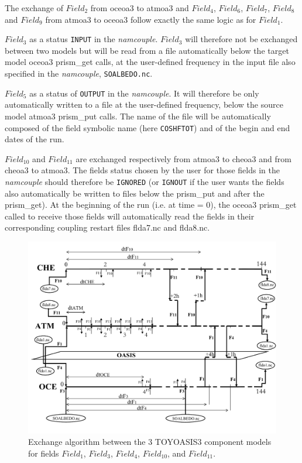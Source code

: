 The exchange of $Field_2$ from oceoa3 to atmoa3 and $Field_4$, $Field_6$,
$Field_7$, $Field_8$ and $Field_9$ from atmoa3 to oceoa3 follow exactly the
same logic as for $Field_1$.

$Field_3$ as a status \texttt{INPUT} in the {\it namcouple}. $Field_3$
will therefore not be exchanged between two models but will be read
from a file automatically below the target model oceoa3 prism\_get
calls, at the user-defined frequency in the input file also specified
in the {\it namcouple}, \texttt{SOALBEDO.nc}.

$Field_5$ as a status of \texttt{OUTPUT} in the {\it namcouple}. It
will therefore be only automatically written to a file at the
user-defined frequency, below the source model atmoa3 prism\_put calls.  The
name of the file will be automatically composed of the field symbolic
name (here \texttt{COSHFTOT}) and of the begin and end dates of the
run. 

$Field_{10}$ and $Field_{11}$ are exchanged respectively from atmoa3 to
cheoa3 and from cheoa3 to atmoa3. The
fields status chosen by the user for those fields in the {\it
namcouple} should therefore be \texttt{IGNORED} (or \texttt{IGNOUT} if
the user wants the fields also automatically be written to files below
the prism\_put and after the prism\_get). At the beginning of the run
(i.e. at time = 0), the oceoa3 prism\_get called to receive those
fields will automatically read the fields in their corresponding
coupling restart files flda7.nc and flda8.nc.

\vspace*{1ex}
\begin{figure}[htbp]
\includegraphics[scale=0.57]{figures/coupling_algo4}
\caption{Exchange algorithm between the 3 TOYOASIS3 component models for
  fields $Field_1$, $Field_3$,
$Field_4$, $Field_{10}$, and $Field_{11}$. }
\label{fig:toyoasis3couplingalgo}
\end{figure}



